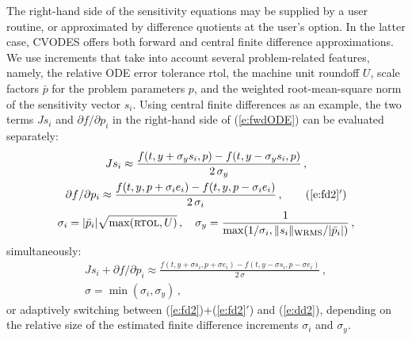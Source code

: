 The right-hand side of the sensitivity equations may be supplied by a 
user routine, or approximated by difference quotients at the user's option.
In the latter case, CVODES offers both forward and central finite 
difference approximations. 
%
We use increments that take into account several problem-related features,
namely, the relative ODE error tolerance {\sc rtol}, 
the machine unit roundoff $U$,
scale factors $\bar p$ for the problem parameters $p$, 
and the weighted root-mean-square norm of the sensitivity vector $s_i$.
%
Using central finite differences as an example, the two terms $J s_i$ 
and ${\partial f}/{\partial p_i}$ in the right-hand side of (\ref{e:fwdODE}) 
can be evaluated separately:
\begin{gather}
  J s_i \approx \frac{f(t, y+\sigma_y s_i, p)-
    f(t, y-\sigma_y s_i, p)}{2\,\sigma_y} \, , \label{e:fd2} \\
  {\partial f}/{\partial p_i} \approx \frac{f(t,y,p + \sigma_i e_i)-
    f(t,y,p - \sigma_i e_i)}{2\,\sigma_i} \, , \tag{\ref{e:fd2}$'$} \\
  \sigma_i = |{\bar p}_i| \sqrt{\max(\mbox{\sc rtol}, U)} \, , \quad
  \sigma_y = \frac{1}{\max(1/\sigma_i, \|s_i\|_{\mbox{\scriptsize WRMS}} / |{\bar p}_i|)} \, , \nonumber
\end{gather}
simultaneously:
\begin{gather}
  J s_i + {\partial f}/{\partial p_i} \approx
  \frac{f(t, y+\sigma s_i, p + \sigma e_i) -
    f(t, y-\sigma s_i, p - \sigma e_i)}{2\,\sigma} \, , \label{e:dd2} \\
  \sigma = \min(\sigma_i, \sigma_y) \, , \nonumber
\end{gather}
or adaptively switching between (\ref{e:fd2})+(\ref{e:fd2}$'$) and (\ref{e:dd2}), 
depending on the relative size of the estimated finite difference 
increments $\sigma_i$ and $\sigma_y$.

